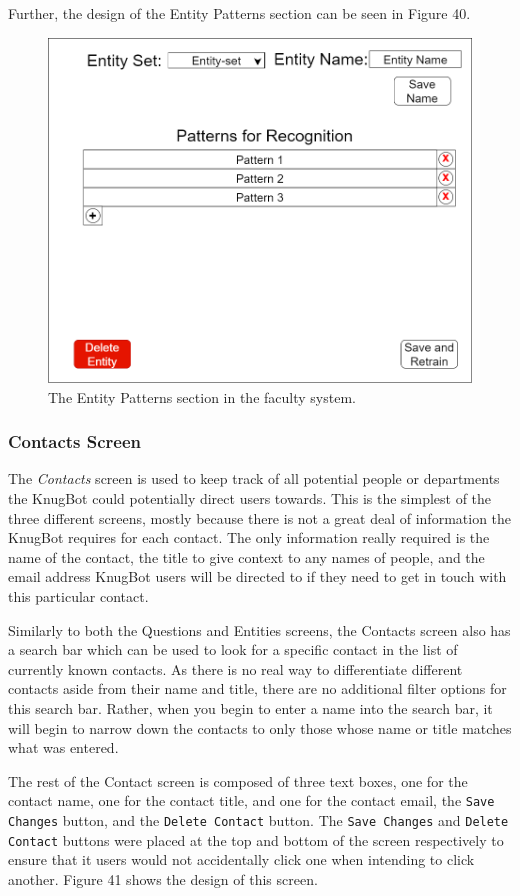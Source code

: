 \documentclass[titlepage, 12pt]{article}
\begin{document}
Further, the design of the Entity Patterns section can be seen in Figure 40.

\begin{figure}[h]
    \centering\includegraphics[width=0.75\linewidth]{images/system-design/faculty-entity-patterns.png}
    \caption{The Entity Patterns section in the faculty system.}
\end{figure}

\subsubsection{Contacts Screen}


The \emph{Contacts} screen is used to keep track of all potential people or departments the KnugBot could potentially direct users towards. This is the simplest of the three different screens, mostly because there is not a great deal of information the KnugBot requires for each contact. The only information really required is the name of the contact, the title to give context to any names of people, and the email address KnugBot users will be directed to if they need to get in touch with this particular contact.

Similarly to both the Questions and Entities screens, the Contacts screen also has a search bar which can be used to look for a specific contact in the list of currently known contacts. As there is no real way to differentiate different contacts aside from their name and title, there are no additional filter options for this search bar. Rather, when you begin to enter a name into the search bar, it will begin to narrow down the contacts to only those whose name or title matches what was entered.

The rest of the Contact screen is composed of three text boxes, one for the contact name, one for the contact title, and one for the contact email, the \texttt{Save Changes} button, and the \texttt{Delete Contact} button. The \texttt{Save Changes} and \texttt{Delete Contact} buttons were placed at the top and bottom of the screen respectively to ensure that it users would not accidentally click one when intending to click another. Figure 41 shows the design of this screen.
\end{document}
